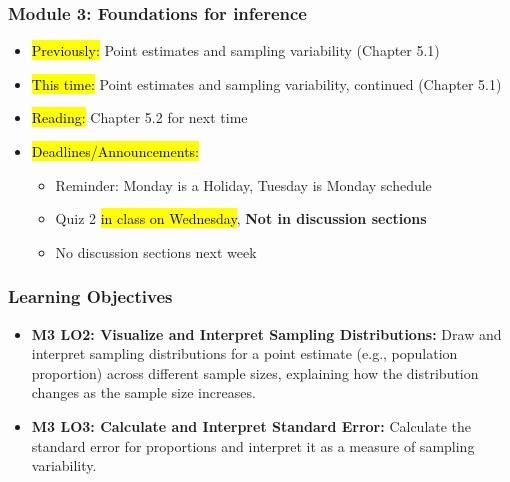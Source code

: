 
\begin{frame}
    \frametitle{Module 3: Foundations for inference}
    \begin{itemize}
        \item \hl{Previously: }Point estimates and sampling variability (Chapter 5.1)
        \item \hl{This time: }Point estimates and sampling variability, continued (Chapter 5.1)
        \item \hl{Reading: }Chapter 5.2 for next time
        \item \hl{Deadlines/Announcements: }
        \begin{itemize}
            \item Reminder: Monday is a Holiday, Tuesday is Monday schedule
            \item Quiz 2 \hl{in class on Wednesday}, \textbf{Not in discussion sections}
            \item No discussion sections next week
        \end{itemize}
    \end{itemize}
    
\end{frame}
    
\begin{frame}
\frametitle{Learning Objectives}
\begin{itemize}
    \item \textbf{M3 LO2: Visualize and Interpret Sampling Distributions:} Draw and interpret sampling distributions for a point estimate (e.g., population proportion) across different sample sizes, explaining how the distribution changes as the sample size increases. 
    \item \textbf{M3 LO3: Calculate and Interpret Standard Error:} Calculate the standard error for proportions and interpret it as a measure of sampling variability.
\end{itemize}
\end{frame}
